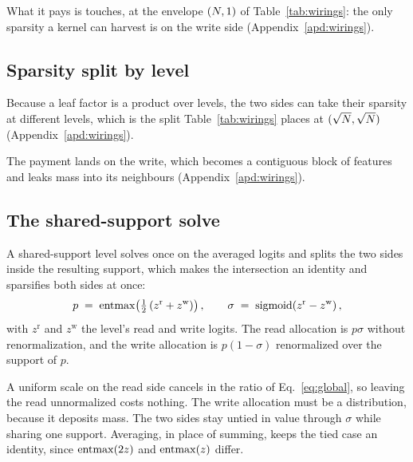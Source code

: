 What it pays is touches, at the envelope $(N, 1)$ of Table~\ref{tab:wirings}: the only sparsity a kernel can harvest is on the write side (Appendix~\ref{apd:wirings}).

\subsection{Sparsity split by level}
\label{sec:levelsides}

Because a leaf factor is a product over levels, the two sides can take their sparsity at different levels, which is the split Table~\ref{tab:wirings} places at $(\sqrt{N}, \sqrt{N})$ (Appendix~\ref{apd:wirings}).

The payment lands on the write, which becomes a contiguous block of features and leaks mass into its neighbours (Appendix~\ref{apd:wirings}).

\subsection{The shared-support solve}
\label{sec:union}

A shared-support level solves once on the averaged logits and splits the two sides inside the resulting support, which makes the intersection an identity and sparsifies both sides at once:
\begin{align}
  p \;=\; \mathrm{entmax}\!\left( \tfrac{1}{2}\left(z^{\mathrm{r}} + z^{\mathrm{w}}\right) \right),
  \qquad
  \sigma \;=\; \mathrm{sigmoid}\!\left( z^{\mathrm{r}} - z^{\mathrm{w}} \right),
  \label{eq:union}
\end{align}
with $z^{\mathrm{r}}$ and $z^{\mathrm{w}}$ the level's read and write logits. The read allocation is $p \sigma$ without renormalization, and the write allocation is $p (1-\sigma)$ renormalized over the support of $p$.

A uniform scale on the read side cancels in the ratio of Eq.~\eqref{eq:global}, so leaving the read unnormalized costs nothing. The write allocation must be a distribution, because it deposits mass.%
{} The two sides stay untied in value through $\sigma$ while sharing one support. Averaging, in place of summing, keeps the tied case an identity, since $\mathrm{entmax}(2z)$ and $\mathrm{entmax}(z)$ differ.

